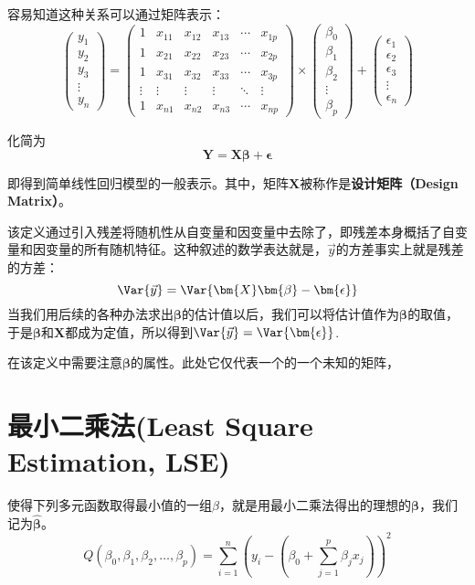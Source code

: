 \documentclass{MGLSA-cn-book-math}
\begin{document}
容易知道这种关系可以通过矩阵表示：
\[
	\begin{pmatrix}
		y_1 \\
		y_2 \\
		y_3 \\
		\vdots \\
		y_n
	\end{pmatrix}
	=
	\begin{pmatrix}
		1 & x_{11} & x_{12} & x_{13} & \cdots & x_{1p} \\
		1 & x_{21} & x_{22} & x_{23} & \cdots & x_{2p} \\
		1 & x_{31} & x_{32} & x_{33} & \cdots & x_{3p} \\
		\vdots & \vdots & \vdots & \vdots & \ddots & \vdots \\
		1 & x_{n1} & x_{n2} & x_{n3} & \cdots & x_{np}
	\end{pmatrix}
	\times
	\begin{pmatrix}
		\beta_0 \\
		\beta_1 \\
		\beta_2 \\
		\vdots \\
		\beta_p
	\end{pmatrix}
	+
	\begin{pmatrix}
		\epsilon_1 \\
		\epsilon_2 \\
		\epsilon_3 \\
		\vdots \\
		\epsilon_n
	\end{pmatrix}
\]

化简为
\[
	\bm{Y}=\bm{X\beta}+\bm{\epsilon}
\]

即得到简单线性回归模型的一般表示。其中，矩阵$\bm{X}$被称作是\textbf{设计矩阵（Design Matrix）}。

该定义通过引入残差将随机性从自变量和因变量中去除了，即残差本身概括了自变量和因变量的所有随机特征。这种叙述的数学表达就是，$\vec{y}$的方差事实上就是残差的方差：
\[
	\Var{\vec{y}}=\Var{\bm{X}\bm{\beta}-\bm{\epsilon}}
\]
当我们用后续的各种办法求出$\bm{\beta}$的估计值以后，我们可以将估计值作为$\bm{\beta}$的取值，于是$\bm{\beta}$和$\bm{X}$都成为定值，所以得到$\Var{\vec{y}}=\Var{\bm{\epsilon}}$.

在该定义中需要注意$\bm{\beta}$的属性。此处它仅代表一个的一个未知的矩阵，

\section{最小二乘法(Least Square Estimation, LSE)}
\label{LSE definition}
使得下列多元函数取得最小值的一组$\beta$，就是用最小二乘法得出的理想的$\bm{\beta}$，我们记为$\bm{\hat\beta}$。
\[
Q(\beta_0,\beta_1,\beta_2,\dots,\beta_p)=\sum_{i=1}^n\left(y_i-\left(\beta_0+\sum_{j=1}^p\beta_jx_j\right)\right)^2
\]
\end{document}
